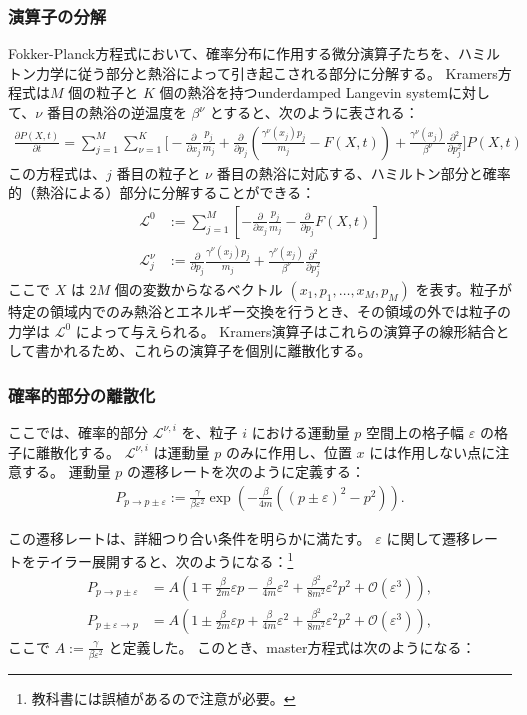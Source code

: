 \documentclass[a4paper,11pt]{jsarticle}
\numberwithin{equation}{section}
\begin{document}
\subsubsection{演算子の分解}
Fokker-Planck方程式において、確率分布に作用する微分演算子たちを、ハミルトン力学に従う部分と熱浴によって引き起こされる部分に分解する。
Kramers方程式は$M$ 個の粒子と $K$ 個の熱浴を持つunderdamped Langevin systemに対して、$\nu$ 番目の熱浴の逆温度を $\beta^\nu$ とすると、次のように表される：
\begin{align}
\frac{\partial P(X, t)}{\partial t} 
= \sum_{j=1}^{M} \sum_{\nu=1}^{K} \Bigg[ 
  -\frac{\partial}{\partial x_j} \frac{p_j}{m_j}
  + \frac{\partial}{\partial p_j} \left( \frac{\gamma^\nu(x_j) p_j}{m_j} - F(X, t) \right)
  + \frac{\gamma^\nu(x_j)}{\beta^\nu} \frac{\partial^2}{\partial p_j^2}
\Bigg] P(X, t)
\end{align}
この方程式は、$j$ 番目の粒子と $\nu$ 番目の熱浴に対応する、ハミルトン部分と確率的（熱浴による）部分に分解することができる：
\begin{align}
\mathcal{L}^0 &:= \sum_{j=1}^{M} \left[
  -\frac{\partial}{\partial x_j} \frac{p_j}{m_j}
  - \frac{\partial}{\partial p_j} F(X, t)
\right]
\\
\mathcal{L}^{\nu}_j &:= \frac{\partial}{\partial p_j} \frac{\gamma^\nu(x_j) p_j}{m_j}
+ \frac{\gamma^\nu(x_j)}{\beta^\nu} \frac{\partial^2}{\partial p_j^2}
\end{align}
ここで $X$ は $2M$ 個の変数からなるベクトル $(x_1, p_1, \dots, x_M, p_M)$ を表す。粒子が特定の領域内でのみ熱浴とエネルギー交換を行うとき、その領域の外では粒子の力学は $\mathcal{L}^0$ によって与えられる。
Kramers演算子はこれらの演算子の線形結合として書かれるため、これらの演算子を個別に離散化する。

\subsubsection{確率的部分の離散化}
ここでは、確率的部分 $\mathcal{L}^{\nu, i}$ を、粒子 $i$ における運動量 $p$ 空間上の格子幅 $\varepsilon$ の格子に離散化する。
$\mathcal{L}^{\nu, i}$ は運動量 $p$ のみに作用し、位置 $x$ には作用しない点に注意する。
運動量 $p$ の遷移レートを次のように定義する：
\begin{align}
P_{p \to p \pm \varepsilon} := \frac{\gamma}{\beta \varepsilon^2}
\exp\left( -\frac{\beta}{4m} \left( (p \pm \varepsilon)^2 - p^2 \right) \right).
\end{align}

この遷移レートは、詳細つり合い条件を明らかに満たす。
$\varepsilon$ に関して遷移レートをテイラー展開すると、次のようになる：\footnote{教科書には誤植があるので注意が必要。}
\begin{align}
P_{p \to p \pm \varepsilon} &= A \left(1 \mp \frac{\beta}{2m} \varepsilon p - \frac{\beta}{4m} \varepsilon^2
+ \frac{\beta^2}{8m^2} \varepsilon^2 p^2 + \mathcal{O}(\varepsilon^3) \right), \\
P_{p \pm \varepsilon \to p} &= A \left(1 \pm \frac{\beta}{2m} \varepsilon p + \frac{\beta}{4m} \varepsilon^2
+ \frac{\beta^2}{8m^2} \varepsilon^2 p^2 + \mathcal{O}(\varepsilon^3) \right),
\end{align}
ここで $A := \frac{\gamma}{\beta \varepsilon^2}$ と定義した。
このとき、master方程式は次のようになる：
\end{document}
